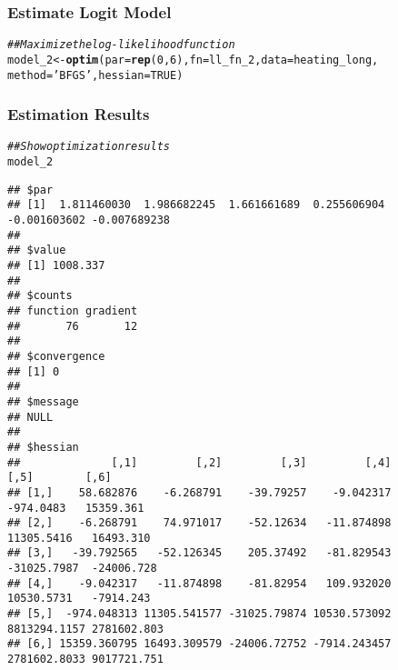 \documentclass{beamer}\usepackage[]{graphicx}\usepackage[]{color}
\makeatletter
\newcommand{\hlnum}[1]{\textcolor[rgb]{0.686,0.059,0.569}{#1}}%
\newcommand{\hlstr}[1]{\textcolor[rgb]{0.192,0.494,0.8}{#1}}%
\newcommand{\hlcom}[1]{\textcolor[rgb]{0.678,0.584,0.686}{\textit{#1}}}%
\newcommand{\hlstd}[1]{\textcolor[rgb]{0.345,0.345,0.345}{#1}}%
\newcommand{\hlkwb}[1]{\textcolor[rgb]{0.69,0.353,0.396}{#1}}%
\newcommand{\hlkwc}[1]{\textcolor[rgb]{0.333,0.667,0.333}{#1}}%
\newcommand{\hlkwd}[1]{\textcolor[rgb]{0.737,0.353,0.396}{\textbf{#1}}}%
\newenvironment{kframe}{%
 \def\at@end@of@kframe{}%
 \ifinner\ifhmode%
  \def\at@end@of@kframe{\end{minipage}}%
  \begin{minipage}{\columnwidth}%
 \fi\fi%
 \def\FrameCommand##1{\hskip\@totalleftmargin \hskip-\fboxsep
 \colorbox{shadecolor}{##1}\hskip-\fboxsep
     \hskip-\linewidth \hskip-\@totalleftmargin \hskip\columnwidth}%
 \MakeFramed {\advance\hsize-\width
   \@totalleftmargin\z@ \linewidth\hsize
   \@setminipage}}%
 {\par\unskip\endMakeFramed%
 \at@end@of@kframe}
\newenvironment{knitrout}{}{} %
\makeatother
\begin{document}
\begin{frame}[fragile]\frametitle{Estimate Logit Model}
\begin{knitrout}\footnotesize
{}\color{fgcolor}\begin{kframe}
\begin{alltt}
\hlcom{## Maximize the log-likelihood function}
\hlstd{model_2} \hlkwb{<-} \hlkwd{optim}\hlstd{(}\hlkwc{par} \hlstd{=} \hlkwd{rep}\hlstd{(}\hlnum{0}\hlstd{,} \hlnum{6}\hlstd{),} \hlkwc{fn} \hlstd{= ll_fn_2,} \hlkwc{data} \hlstd{= heating_long,}
                 \hlkwc{method} \hlstd{=} \hlstr{'BFGS'}\hlstd{,} \hlkwc{hessian} \hlstd{=} \hlnum{TRUE}\hlstd{)}
\end{alltt}
\end{kframe}
\end{knitrout}
\end{frame}

\begin{frame}[fragile]\frametitle{Estimation Results}
    \vspace{1ex}
    
\begin{knitrout}\tiny
{}\color{fgcolor}\begin{kframe}
\begin{alltt}
\hlcom{## Show optimization results}
\hlstd{model_2}
\end{alltt}
\begin{verbatim}
## $par
## [1]  1.811460030  1.986682245  1.661661689  0.255606904 -0.001603602 -0.007689238
## 
## $value
## [1] 1008.337
## 
## $counts
## function gradient 
##       76       12 
## 
## $convergence
## [1] 0
## 
## $message
## NULL
## 
## $hessian
##              [,1]         [,2]         [,3]         [,4]         [,5]        [,6]
## [1,]    58.682876    -6.268791    -39.79257    -9.042317    -974.0483   15359.361
## [2,]    -6.268791    74.971017    -52.12634   -11.874898   11305.5416   16493.310
## [3,]   -39.792565   -52.126345    205.37492   -81.829543  -31025.7987  -24006.728
## [4,]    -9.042317   -11.874898    -81.82954   109.932020   10530.5731   -7914.243
## [5,]  -974.048313 11305.541577 -31025.79874 10530.573092 8813294.1157 2781602.803
## [6,] 15359.360795 16493.309579 -24006.72752 -7914.243457 2781602.8033 9017721.751
\end{verbatim}
\end{kframe}
\end{knitrout}
\end{frame}
\end{document}
